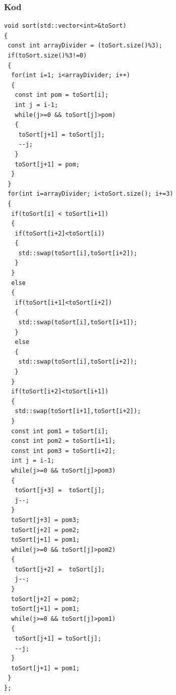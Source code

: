 \subsubsection{Kod}
\begin{lstlisting}[caption={Sortowanie przez wstawianie dla trójek},label={lst:wstawianie}]
void sort(std::vector<int>&toSort)
{
 const int arrayDivider = (toSort.size()%3);
 if(toSort.size()%3!=0)
 {
  for(int i=1; i<arrayDivider; i++)
  {
   const int pom = toSort[i];
   int j = i-1;
   while(j>=0 && toSort[j]>pom)
   {
    toSort[j+1] = toSort[j];
    --j;
   }
   toSort[j+1] = pom;
  }
 }
 for(int i=arrayDivider; i<toSort.size(); i+=3)
 {
  if(toSort[i] < toSort[i+1])
  {
   if(toSort[i+2]<toSort[i])
   {
    std::swap(toSort[i],toSort[i+2]);
   }
  }
  else
  {
   if(toSort[i+1]<toSort[i+2])
   {
    std::swap(toSort[i],toSort[i+1]);
   }
   else
   {
    std::swap(toSort[i],toSort[i+2]);
   }
  }
  if(toSort[i+2]<toSort[i+1])
  {
   std::swap(toSort[i+1],toSort[i+2]);
  }
  const int pom1 = toSort[i];
  const int pom2 = toSort[i+1];
  const int pom3 = toSort[i+2];
  int j = i-1;
  while(j>=0 && toSort[j]>pom3)
  {
   toSort[j+3] =  toSort[j];
   j--;
  }
  toSort[j+3] = pom3;
  toSort[j+2] = pom2;
  toSort[j+1] = pom1;
  while(j>=0 && toSort[j]>pom2)
  {
   toSort[j+2] =  toSort[j];
   j--;
  }
  toSort[j+2] = pom2;
  toSort[j+1] = pom1;
  while(j>=0 && toSort[j]>pom1)
  {
   toSort[j+1] = toSort[j];
   --j;
  }
  toSort[j+1] = pom1;
 }
};
\end{lstlisting}

